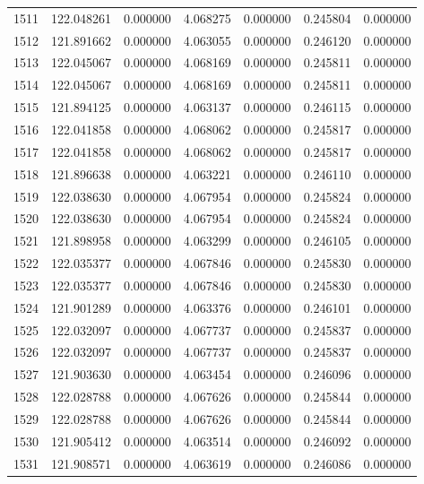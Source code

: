 \begin{tabular}{rrrrrrr}
1511 & 122.048261 &    0.000000 &  4.068275 &    0.000000 &    0.245804 &  0.000000 \\
1512 & 121.891662 &    0.000000 &  4.063055 &    0.000000 &    0.246120 &  0.000000 \\
1513 & 122.045067 &    0.000000 &  4.068169 &    0.000000 &    0.245811 &  0.000000 \\
1514 & 122.045067 &    0.000000 &  4.068169 &    0.000000 &    0.245811 &  0.000000 \\
1515 & 121.894125 &    0.000000 &  4.063137 &    0.000000 &    0.246115 &  0.000000 \\
1516 & 122.041858 &    0.000000 &  4.068062 &    0.000000 &    0.245817 &  0.000000 \\
1517 & 122.041858 &    0.000000 &  4.068062 &    0.000000 &    0.245817 &  0.000000 \\
1518 & 121.896638 &    0.000000 &  4.063221 &    0.000000 &    0.246110 &  0.000000 \\
1519 & 122.038630 &    0.000000 &  4.067954 &    0.000000 &    0.245824 &  0.000000 \\
1520 & 122.038630 &    0.000000 &  4.067954 &    0.000000 &    0.245824 &  0.000000 \\
1521 & 121.898958 &    0.000000 &  4.063299 &    0.000000 &    0.246105 &  0.000000 \\
1522 & 122.035377 &    0.000000 &  4.067846 &    0.000000 &    0.245830 &  0.000000 \\
1523 & 122.035377 &    0.000000 &  4.067846 &    0.000000 &    0.245830 &  0.000000 \\
1524 & 121.901289 &    0.000000 &  4.063376 &    0.000000 &    0.246101 &  0.000000 \\
1525 & 122.032097 &    0.000000 &  4.067737 &    0.000000 &    0.245837 &  0.000000 \\
1526 & 122.032097 &    0.000000 &  4.067737 &    0.000000 &    0.245837 &  0.000000 \\
1527 & 121.903630 &    0.000000 &  4.063454 &    0.000000 &    0.246096 &  0.000000 \\
1528 & 122.028788 &    0.000000 &  4.067626 &    0.000000 &    0.245844 &  0.000000 \\
1529 & 122.028788 &    0.000000 &  4.067626 &    0.000000 &    0.245844 &  0.000000 \\
1530 & 121.905412 &    0.000000 &  4.063514 &    0.000000 &    0.246092 &  0.000000 \\
1531 & 121.908571 &    0.000000 &  4.063619 &    0.000000 &    0.246086 &  0.000000 \\

\end{tabular}
